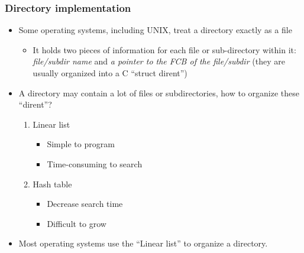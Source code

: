 \documentclass[CJKutf8,xcolor=pdftex,dvipsnames,table]{beamer}
\begin{document}
\begin{CJK*}{UTF8}{song}
  \begin{frame}
    \frametitle{Directory implementation} \pause
    \begin{itemize}\parskip=0pt
    \item Some operating systems, including UNIX, treat a directory exactly as a file \pause
      \begin{itemize}\parskip=0pt
      \item It holds two pieces of information for each file or sub-directory within it: \emph{file/subdir name} and \emph{a pointer to the FCB of the file/subdir} (they are usually organized into a C ``struct dirent'') \pause
      \end{itemize}
    \item A directory may contain a lot of files or subdirectories, how to organize these ``dirent''? \pause
      \begin{enumerate}\parskip=0pt
      \item Linear list \pause
        \begin{itemize}\parskip=0pt
        \item Simple to program \pause
        \item Time-consuming to search \pause
        \end{itemize}
      \item Hash table \pause
        \begin{itemize}\parskip=0pt
        \item Decrease search time \pause
        \item Difficult to grow \pause
        \end{itemize}
      \end{enumerate}
    \item Most operating systems use the ``Linear list'' to organize a directory.
    \end{itemize}
  \end{frame}
  

\end{CJK*}
\end{document}
